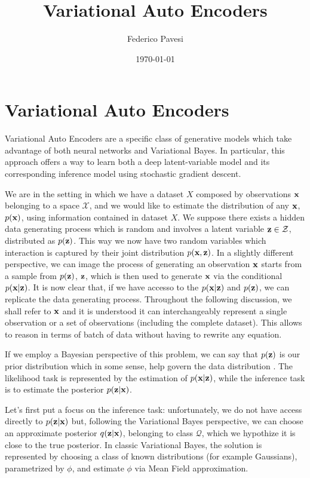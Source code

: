 \documentclass[12pt]{article}
\title{Variational Auto Encoders}
\author{Federico Pavesi}
\date{\today}
\begin{document}
\maketitle
\section{Variational Auto Encoders}

Variational Auto Encoders \cite{kingma2022autoencoding} \cite{pmlr-v32-rezende14} are a specific class of generative models which take advantage of both neural networks and Variational Bayes. In particular, this approach offers a way to learn both a deep latent-variable model and its corresponding inference model using stochastic gradient  descent\cite{VAEIntro}. 

We are in the setting in which we have a dataset \(X\) composed by observations \(\textbf{x}\) belonging to a space \(\mathcal{X}\), and we would like to estimate the distribution of any \(\textbf{x}\), \(p (\textbf{x})\), using information contained in dataset \(X\). We suppose there exists a hidden data generating process which is random and involves a latent variable \(\textbf{z} \in \mathcal{Z}\), distributed as \(p (\textbf{z})\). This way we now have two random variables which interaction is captured by their joint distribution \(p (\textbf{x}, \textbf{z}) \). In a slightly different perspective, we can image the process of generating an observation \(\textbf{x}\) starts from a sample from \(p(\textbf{z})\), \(\textbf{z}\), which is then used to generate \(\textbf{x}\) via the conditional \(p (\textbf{x} | \textbf{z}) \). It is now clear that, if we have accesso to the \(p (\textbf{x} | \textbf{z}) \) and \(p(\textbf{z})\), we can replicate the data generating process. Throughout the following discussion, we shall refer to \(\textbf{x}\) and it is understood it can interchangeably represent a single observation or a set of observations (including the complete dataset). This allows to reason in terms of batch of data without having to rewrite any equation.

If we employ a Bayesian perspective of this problem, we can say that \(p(\textbf{z})\) is our prior distribution which in some sense, help govern the data distribution \cite{VI_review}. The likelihood task is represented by the estimation of \(p (\textbf{x} | \textbf{z}) \), while the inference task is to estimate the posterior \(p (\textbf{z} | \textbf{x}) \). 

Let's first put a focus on the inference task: unfortunately, we do not have access directly to \(p (\textbf{z} | \textbf{x}) \) but, following the Variational Bayes perspective, we can choose an approximate posterior \(q (\textbf{z} | \textbf{x}) \), belonging to class \(\mathcal{Q}\), which we hypothize it is close to the true posterior. In classic Variational Bayes, the solution is represented by choosing a class of known distributions (for example Gaussians), parametrized by \(\phi\), and estimate \(\phi\) via Mean Field approximation.
\end{document}
